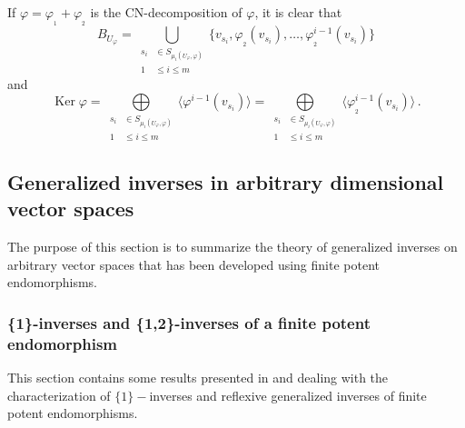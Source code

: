 \documentclass[10pt,a4paper]{amsart}
\theoremstyle{plain}
\theoremstyle{remark}
\numberwithin{equation}{section} \numberwithin{defn}{section}
\newcommand\Ker{\operatorname{Ker}}
\begin{document}
If $\varphi = \varphi_{_1} + \varphi_{_2}$ is the CN-decomposition of $\varphi$, it is clear that  $$ B_{U_\varphi} =  \underset {\begin{aligned} s_i &\in S_{{\mu}_i (U_\varphi, \varphi)} \\ 1 &\leq i \leq m \end{aligned}} {\bigcup} \{{ {v_{s_i}}}, \varphi_{_2} ({{ v_{s_i}}}), \dots , \varphi_{_2}^{i-1} ({ {v_{s_i}}})\}$$\noindent and 
\begin{equation}\label{eq: KerFP}
\Ker \varphi =  \underset {\begin{aligned} s_i &\in S_{{\mu}_i (U_\varphi, \varphi)} \\ 1 &\leq i \leq m \end{aligned}} {\bigoplus} \langle \varphi^{i-1} ({ {v_{s_i}}}) \rangle =  \underset {\begin{aligned} s_i &\in S_{{\mu}_i (U_\varphi, \varphi)} \\ 1 &\leq i \leq m \end{aligned}} {\bigoplus} \langle \varphi_{_2}^{i-1} ({ {v_{s_i}}}) \rangle\, .
\end{equation}

\subsection{Generalized inverses in arbitrary dimensional vector spaces}\label{ss: GIarbitrarydim}

The purpose of this section is to summarize the theory of generalized inverses on arbitrary vector spaces that has been developed using finite potent endomorphisms.

\subsubsection{\{1\}-inverses and \{1,2\}-inverses of a finite potent endomorphism}\label{ss: 1inv fp}
This section contains some results presented in \cite{Die-Fpa} and\cite{PaAl} dealing with the characterization of $\{1\}-$inverses and reflexive generalized inverses of finite potent endomorphisms.
\end{document}
